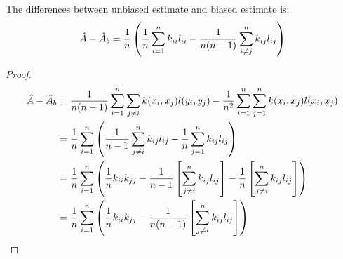 \begin{proposition}
    The differences between unbiased estimate and biased estimate is:
    \begin{equation*}
        \hat{A} - \hat{A}_b = \frac{1}{n}\left( \frac{1}{n} \sum^n_{i=1}k_{ii}l_{ii} - \frac{1}{n(n-1)}\sum^n_{i\ne j}k_{ij}l_{ij}  \right)
    \end{equation*}
\end{proposition}
\begin{proof}
    \begin{equation*}
    \begin{aligned}
        \hat{A} - \hat{A}_b &= \frac{1}{n(n-1)}\sum^n_{i=1}\sum_{j\ne i} k(x_i, x_j)l(y_i, y_j) - \frac{1}{n^2}\sum^n_{i=1}\sum^n_{j=1}k(x_i, x_j)l(x_i, x_j) \\
        &= \frac{1}{n} \sum^n_{i=1} \left( \frac{1}{n-1}\sum^n_{j\ne i} k_{ij}l_{ij} - \frac{1}{n}\sum^n_{j=1}k_{ij}l_{ij}  \right) \\
        &= \frac{1}{n} \sum^n_{i=1}\left( \frac{1}{n} k_{ii}k_{jj} - \frac{1}{n-1}\left[ \sum_{j\ne i}^n k_{ij}l_{ij}  \right] - \frac{1}{n}\left[ \sum_{j\ne i}^n k_{ij}l_{ij}  \right]  \right) \\
        &= \frac{1}{n} \sum^n_{i=1}\left( \frac{1}{n} k_{ii}k_{jj} - \frac{1}{n(n-1)}\left[ \sum_{j\ne i}^n k_{ij}l_{ij}  \right]  \right) \\
    \end{aligned}
    \end{equation*}
\end{proof}


